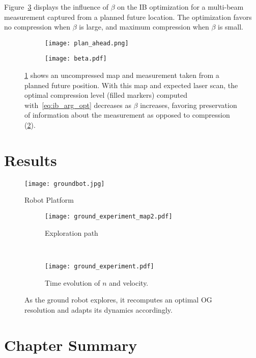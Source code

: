 Figure~\ref{fig:loss_compression} displays the influence of $\beta$ on the IB optimization for a multi-beam measurement captured from a planned future location. The optimization favors no compression when $\beta$ is large, and maximum compression when $\beta$ is small.

\begin{figure}
    \centering
    \begin{subfigure}[t]{0.45\textwidth}
        \centering
        \texttt{[image: plan\_ahead.png]}
        \caption{\label{fig:loss_compression1}}
    \end{subfigure}
    \hfill
    \begin{subfigure}[t]{0.45\textwidth}
        \centering
        \texttt{[image: beta.pdf]}
        \caption{\label{fig:loss_compression2}}
    \end{subfigure}
    \caption[Information Bottleneck optimization for varying values of $\beta$]{\ref{fig:loss_compression1} shows an uncompressed map and measurement taken from a planned future position. With this map and expected laser scan, the optimal compression level (filled markers) computed with~\eqref{eq:ib_arg_opt} decreases as $\beta$ increases, favoring preservation of information about the measurement as opposed to compression (\ref{fig:loss_compression2}). \label{fig:loss_compression}}
\end{figure}

\section{Results}

\begin{figure}
  \centering
  \texttt{[image: groundbot.jpg]}
  \caption{Robot Platform\label{fig:robot_platform}}
\end{figure}

\begin{figure}
  \centering
  \begin{subfigure}[t]{0.64\textwidth}
    \centering
    \texttt{[image: ground\_experiment\_map2.pdf]}
    \caption{Exploration path \label{fig:ib_exploration_path}}
  \end{subfigure}
  \\
  \begin{subfigure}[t]{0.8\textwidth}
    \centering
    \texttt{[image: ground\_experiment.pdf]}
    \caption{Time evolution of $n$ and velocity.\label{fig:ib_exploration_plots}}
  \end{subfigure}
  \caption{As the ground robot explores, it recomputes an optimal OG resolution and adapts its dynamics accordingly.\label{fig:ground_experiment}}
\end{figure}



\section{Chapter Summary}
